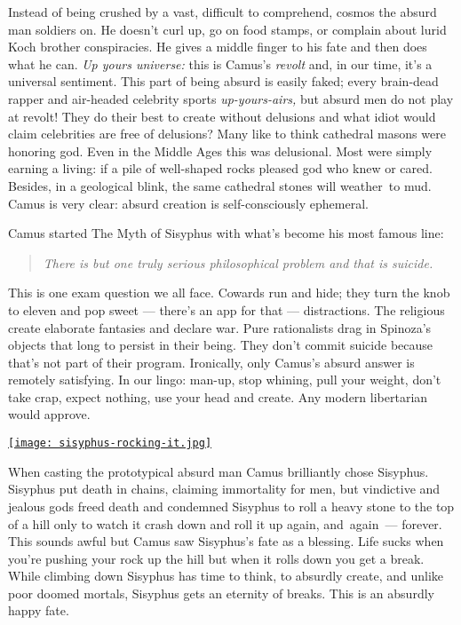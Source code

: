 Instead of being crushed by a vast, difficult to comprehend, cosmos the
absurd man soldiers on. He doesn't curl up, go on food stamps, or
complain about lurid Koch brother conspiracies. He gives a middle finger
to his fate and then does what he can. \emph{Up yours universe:} this is
Camus's \emph{revolt} and, in our time, it's a universal sentiment. This
part of being absurd is easily faked; every brain-dead rapper and
air-headed celebrity sports \emph{up-yours-airs,} but absurd men do not
play at revolt! They do their best to create without delusions and what
idiot would claim celebrities are free of delusions? Many like to think
cathedral masons were honoring god. Even in the Middle Ages this was
delusional. Most were simply earning a living: if a pile of well-shaped
rocks pleased god who knew or cared. Besides, in a geological blink, the
same cathedral stones will weather~to mud. Camus is very clear: absurd
creation is self-consciously ephemeral.

Camus started The Myth of Sisyphus with what's become his most famous
line:

\begin{quotation}
    \emph{There is but one truly serious philosophical problem and that is suicide.}
\end{quotation}

This is one exam question we all face. Cowards run and hide; they turn
the knob to eleven and pop sweet --- there's an app for that ---
distractions. The religious create elaborate fantasies and declare war.
Pure rationalists drag in Spinoza's objects that long to persist in
their being. They don't commit suicide because that's not part of their
program. Ironically, only Camus's absurd answer is remotely satisfying.
In our lingo: man-up, stop whining, pull your weight, don't take crap,
expect nothing, use your head and create. Any modern libertarian would
approve.


\begin{floatingfigure}[r]{0.24\textwidth}
\centering
\href{http://www.wikipaintings.org/en/titian/sisyphus-1549}{\texttt{[image: sisyphus-rocking-it.jpg]}}
\label{fig:3844X1}
\end{floatingfigure} When
casting the prototypical absurd man Camus brilliantly chose Sisyphus.
Sisyphus put death in chains, claiming immortality for men, but vindictive
and jealous gods freed death and condemned Sisyphus to roll a heavy
stone to the top of a hill only to watch it crash down and roll it
up again, and~again~--- forever. This sounds awful but Camus saw
Sisyphus's fate as a blessing. Life sucks when you're pushing your rock
up the hill but when it rolls down you get a break. While climbing down
Sisyphus has time to think, to absurdly create, and unlike poor
doomed mortals, Sisyphus gets an eternity of breaks. This is an absurdly
happy fate.

